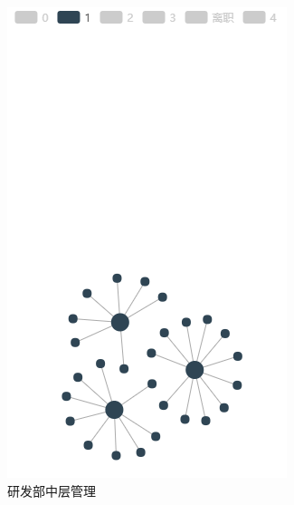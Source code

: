 \documentclass[journal]{vgtc}                %
\begin{document}
\begin{figure}
\begin{subfigure}{0.3\linewidth}
		\includegraphics[width=\linewidth]{pictures/5-2.png}
		\caption{研发部中层管理} %
		\label{fig:med}
	\end{subfigure}
	\begin{subfigure}{0.3\linewidth} %

\end{subfigure}
\end{figure}
\end{document}
